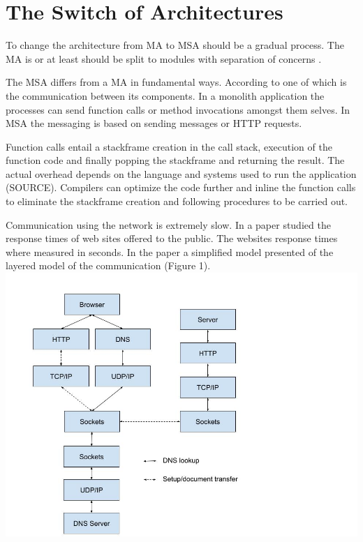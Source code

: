 \section{The Switch of Architectures}
\begin{sloppypar}
    To change the architecture from MA to MSA should be a gradual process. The MA is or at least should be  
    split to modules with separation of concerns \citep{secchalmsa}.
\end{sloppypar}

\begin{sloppypar}
    The MSA differs from a MA in fundamental ways. According to \citet{fowlerlewisms} 
    one of which is the communication between its components. In a monolith 
    application the processes can send function calls or method invocations 
    amongst them selves. In MSA the messaging is based on sending messages or 
    HTTP requests.
\end{sloppypar}

\begin{sloppypar}
    Function calls entail a stackframe creation in the call stack, execution of 
    the function code and finally popping the stackframe and returning the result. 
    The actual overhead depends on the language and systems used to run the 
    application (SOURCE). Compilers can optimize the code further and inline the function calls to
    eliminate the stackframe creation and following procedures to be carried out.
\end{sloppypar}

\begin{sloppypar}
    Communication using the network is extremely slow. In a paper \citet{webdelays} 
    studied the response times of web sites offered to the public. The websites 
    response times where measured in seconds. In the paper a simplified model 
    presented of the layered model of the communication (Figure 1).
    \includegraphics{HTTPlayers}
\end{sloppypar}

